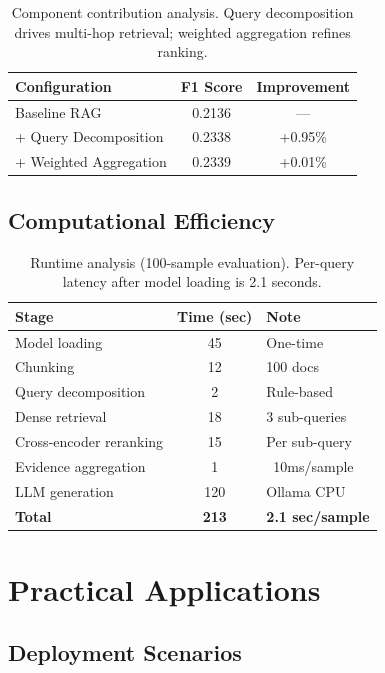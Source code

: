 \documentclass[twocolumn,11pt]{article}
\begin{document}
\begin{table}[H]
\centering
\small
\begin{tabular}{|l|c|c|}
\hline
\textbf{Configuration} & \textbf{F1 Score} & \textbf{Improvement} \\
\hline
Baseline RAG & 0.2136 & --- \\
+ Query Decomposition & 0.2338 & +0.95\% \\
+ Weighted Aggregation & 0.2339 & +0.01\% \\
\hline
\end{tabular}
\caption{Component contribution analysis. Query decomposition drives multi-hop retrieval; weighted aggregation refines ranking.}
\label{tab:ablation}
\end{table}

\subsection{Computational Efficiency}

\begin{table}[H]
\centering
\small
\begin{tabular}{|l|c|l|}
\hline
\textbf{Stage} & \textbf{Time (sec)} & \textbf{Note} \\
\hline
Model loading & 45 & One-time \\
Chunking & 12 & 100 docs \\
Query decomposition & 2 & Rule-based \\
Dense retrieval & 18 & 3 sub-queries \\
Cross-encoder reranking & 15 & Per sub-query \\
Evidence aggregation & 1 & ~10ms/sample \\
LLM generation & 120 & Ollama CPU \\
\hline
\textbf{Total} & \textbf{213} & \textbf{2.1 sec/sample} \\
\hline
\end{tabular}
\caption{Runtime analysis (100-sample evaluation). Per-query latency after model loading is 2.1 seconds.}
\label{tab:runtime}
\end{table}

\section{Practical Applications}

\subsection{Deployment Scenarios}
\end{document}

